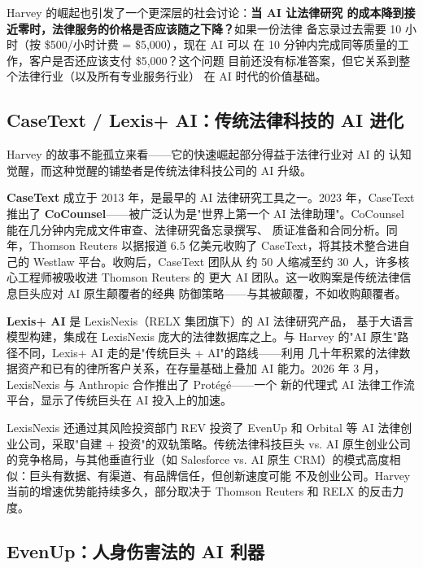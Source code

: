 Harvey 的崛起也引发了一个更深层的社会讨论：\textbf{当 AI 让法律研究
的成本降到接近零时，法律服务的价格是否应该随之下降？}如果一份法律
备忘录过去需要 10 小时（按 \$500/小时计费 = \$5,000），现在 AI 可以
在 10 分钟内完成同等质量的工作，客户是否还应该支付 \$5,000？这个问题
目前还没有标准答案，但它关系到整个法律行业（以及所有专业服务行业）
在 AI 时代的价值基础。


\subsection{CaseText / Lexis+ AI：传统法律科技的 AI 进化}
\label{subsec:casetext-lexis}

Harvey 的故事不能孤立来看——它的快速崛起部分得益于法律行业对 AI 的
认知觉醒，而这种觉醒的铺垫者是传统法律科技公司的 AI 升级。

\textbf{CaseText} 成立于 2013 年，是最早的 AI 法律研究工具之一。2023
年，CaseText 推出了 \textbf{CoCounsel}——被广泛认为是"世界上第一个
AI 法律助理"。CoCounsel 能在几分钟内完成文件审查、法律研究备忘录撰写、
质证准备和合同分析。同年，Thomson Reuters 以据报道 6.5 亿美元收购了
CaseText，将其技术整合进自己的 Westlaw 平台。收购后，CaseText 团队从
约 50 人缩减至约 30 人，许多核心工程师被吸收进 Thomson Reuters 的
更大 AI 团队。这一收购案是传统法律信息巨头应对 AI 原生颠覆者的经典
防御策略——与其被颠覆，不如收购颠覆者。

\textbf{Lexis+ AI} 是 LexisNexis（RELX 集团旗下）的 AI 法律研究产品，
基于大语言模型构建，集成在 LexisNexis 庞大的法律数据库之上。与 Harvey
的"AI 原生"路径不同，Lexis+ AI 走的是"传统巨头 + AI"的路线——利用
几十年积累的法律数据资产和已有的律所客户关系，在存量基础上叠加 AI
能力。2026 年 3 月，LexisNexis 与 Anthropic 合作推出了 Protégé——一个
新的代理式 AI 法律工作流平台，显示了传统巨头在 AI 投入上的加速。

LexisNexis 还通过其风险投资部门 REV 投资了 EvenUp 和 Orbital 等 AI
法律创业公司，采取"自建 + 投资"的双轨策略。传统法律科技巨头 vs. AI
原生创业公司的竞争格局，与其他垂直行业（如 Salesforce vs. AI 原生
CRM）的模式高度相似：巨头有数据、有渠道、有品牌信任，但创新速度可能
不及创业公司。Harvey 当前的增速优势能持续多久，部分取决于 Thomson
Reuters 和 RELX 的反击力度。


\subsection{EvenUp：人身伤害法的 AI 利器}
\label{subsec:evenup}

